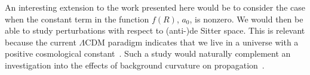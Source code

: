 An interesting extension to the work presented here would be to consider the case when the constant term in the function $f(R)$, $a_0$, is nonzero. We would then be able to study perturbations with respect to (anti-)de Sitter space. This is relevant because the current $\Lambda$CDM paradigm indicates that we live in a universe with a positive cosmological constant~\cite{Jarosik2011, Komatsu2011}. Such a study would naturally complement an investigation into the effects of background curvature on propagation~\cite{Yang2011}.
